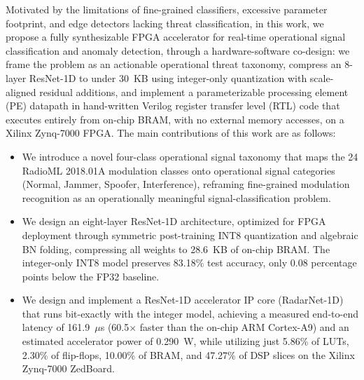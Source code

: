 \documentclass[conference]{IEEEtran}
\begin{document}
Motivated by the limitations of fine-grained classifiers, excessive parameter footprint, and edge detectors lacking threat classification, in this work, we propose a fully synthesizable FPGA accelerator for real-time operational signal classification and anomaly detection, through a hardware-software co-design: we frame the problem as an actionable operational threat taxonomy, compress an 8-layer ResNet-1D to under 30~KB using integer-only quantization with scale-aligned residual additions, and implement a parameterizable processing element (PE) datapath in hand-written Verilog register transfer level (RTL) code that executes entirely from on-chip BRAM, with no external memory accesses, on a Xilinx Zynq-7000 FPGA. The main contributions of this work are as follows:
\begin{itemize}
    \item We introduce a novel four-class operational signal taxonomy that maps the 24 RadioML 2018.01A modulation classes onto operational signal categories (Normal, Jammer, Spoofer, Interference), reframing fine-grained modulation recognition as an operationally meaningful signal-classification problem.
    \item We design an eight-layer ResNet-1D architecture, optimized for FPGA deployment through symmetric post-training INT8 quantization and algebraic BN folding, compressing all weights to 28.6~KB of on-chip BRAM. The integer-only INT8 model preserves 83.18\% test accuracy, only 0.08 percentage points below the FP32 baseline.
    \item We design and implement a ResNet-1D accelerator IP core (RadarNet-1D) that runs bit-exactly with the integer model, achieving a measured end-to-end latency of 161.9~$\mu$s (60.5$\times$ faster than the on-chip ARM Cortex-A9) and an estimated accelerator power of 0.290~W, while utilizing just 5.86\% of LUTs, 2.30\% of flip-flops, 10.00\% of BRAM, and 47.27\% of DSP slices on the Xilinx Zynq-7000 ZedBoard.
\end{itemize}
\end{document}
